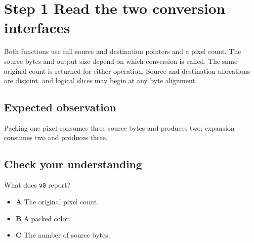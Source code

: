 \section{Step 1 Read the two conversion interfaces}\label{rgb-s01}

Both functions use full source and destination pointers and a pixel count. The source bytes and output size depend on which conversion is called. The same original count is returned for either operation. Source and destination allocations are disjoint, and logical slices may begin at any byte alignment.

\subsection{Expected observation}
Packing one pixel consumes three source bytes and produces two; expansion consumes two and produces three.

\subsection{Check your understanding}
What does \texttt{v0} report?

\begin{itemize}
  \item \textbf{A} The original pixel count.
  \item \textbf{B} A packed color.
  \item \textbf{C} The number of source bytes.
\end{itemize}

